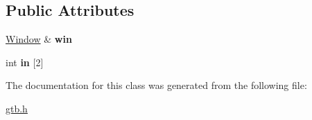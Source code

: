 \subsection*{Public Attributes}
\begin{DoxyCompactItemize}
\item 
\mbox{\label{a00044_ac4b9dc02472ac3dfbc1f782ad199f544}} 
\hyperlink{a00036}{Window} \& {\bfseries win}
\item 
\mbox{\label{a00044_aa932c88c46ea54581eecef2e549e0d12}} 
int {\bfseries in} \mbox{[}2\mbox{]}
\end{DoxyCompactItemize}


The documentation for this class was generated from the following file\+:\begin{DoxyCompactItemize}
\item 
\hyperlink{a00005}{gtb.\+h}\end{DoxyCompactItemize}

